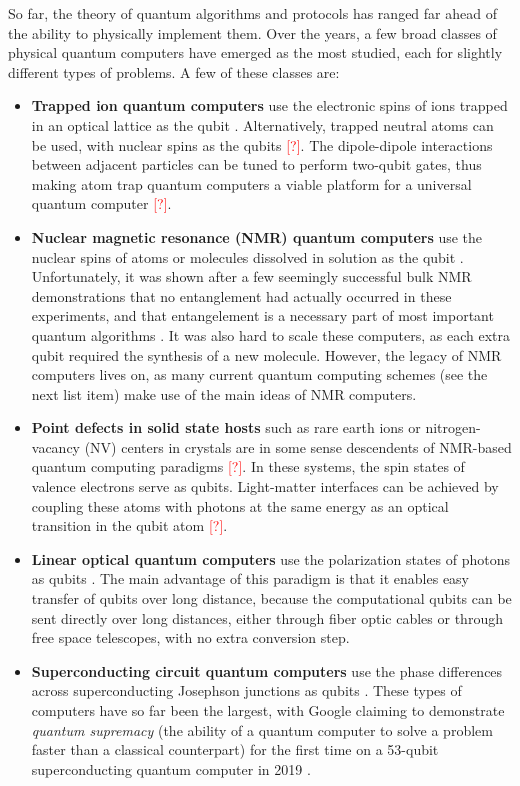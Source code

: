 \documentclass[12pt]{puthesis}
\newcommand{\notetoself}[1]{\textcolor{red}{#1}}
\begin{document}
So far, the theory of quantum algorithms and protocols has ranged far ahead of the ability to physically implement them. Over the years, a few broad classes of physical quantum computers have emerged as the most studied, each for slightly different types of problems. A few of these classes are:
\newcommand{\listheader}[1]{\textbf{#1}}
\begin{itemize}
  
\item \listheader{Trapped ion quantum computers} use the electronic spins of ions trapped in an optical lattice as the qubit \cite{Cirac1995}. Alternatively, trapped neutral atoms can be used, with nuclear spins as the qubits \notetoself{[?]}. The dipole-dipole interactions between adjacent particles can be tuned to perform two-qubit gates, thus making atom trap quantum computers a viable platform for a universal quantum computer \notetoself{[?]}.
  
\item \listheader{Nuclear magnetic resonance (NMR) quantum computers} use the nuclear spins of atoms or molecules dissolved in solution as the qubit \cite{Cory1997}. Unfortunately, it was shown after a few seemingly successful bulk NMR demonstrations that no entanglement had actually occurred in these experiments, and that entangelement is a necessary part of most important quantum algorithms \cite{Braunstein1999,Linden2001}. It was also hard to scale these computers, as each extra qubit required the synthesis of a new molecule. However, the legacy of NMR computers lives on, as many current quantum computing schemes (see the next list item) make use of the main ideas of NMR computers.
  
\item \listheader{Point defects in solid state hosts} such as rare earth ions or nitrogen-vacancy (NV) centers in crystals are in some sense descendents of NMR-based quantum computing paradigms \notetoself{[?]}. In these systems, the spin states of valence electrons serve as qubits. Light-matter interfaces can be achieved by coupling these atoms with photons at the same energy as an optical transition in the qubit atom \notetoself{[?]}. 

\item \listheader{Linear optical quantum computers} use the polarization states of photons as qubits \cite{Knill2001}. The main advantage of this paradigm is that it enables easy transfer of qubits over long distance, because the computational qubits can be sent directly over long distances, either through fiber optic cables or through free space telescopes, with no extra conversion step. 
    
\item \listheader{Superconducting circuit quantum computers} use the phase differences across superconducting Josephson junctions as qubits \cite{Nakamura1999}. These types of computers have so far been the largest, with Google claiming to demonstrate \emph{quantum supremacy} (the ability of a quantum computer to solve a problem faster than a classical counterpart) for the first time on a 53-qubit superconducting quantum computer in 2019 \cite{Arute2019}.
  
\end{itemize}
\end{document}
